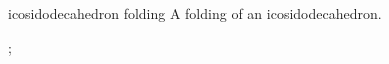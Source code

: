 \begin{pictype}{icosidodecahedron folding}{}
    A folding of an icosidodecahedron.
\begin{codeexample}[preamble={\usetikzlibrary{folding}}]
\tikz {};
\end{codeexample}
\end{pictype}



